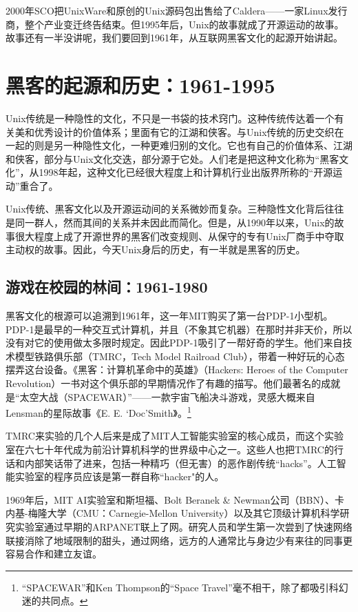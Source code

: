 \documentclass[12pt,oneside]{book}
\begin{document}
\begin{common-format}
2000年SCO把UnixWare和原创的Unix源码包出售给了Caldera——一家Linux发行商，整个产业变迁终告结束。但1995年后，Unix的故事就成了开源运动的故事。故事还有一半没讲呢，我们要回到1961年，从互联网黑客文化的起源开始讲起。

\section{黑客的起源和历史：1961-1995}
Unix传统是一种隐性的文化，不只是一书袋的技术窍门。这种传统传达着一个有关美和优秀设计的价值体系；里面有它的江湖和侠客。与Unix传统的历史交织在一起的则是另一种隐性文化，一种更难归别的文化。它也有自己的价值体系、江湖和侠客，部分与Unix文化交迭，部分源于它处。人们老是把这种文化称为“黑客文化”，从1998年起，这种文化已经很大程度上和计算机行业出版界所称的“开源运动”重合了。

Unix传统、黑客文化以及开源运动间的关系微妙而复杂。三种隐性文化背后往往是同一群人，然而其间的关系并未因此而简化。但是，从1990年以来，Unix的故事很大程度上成了开源世界的黑客们改变规则、从保守的专有Unix厂商手中夺取主动权的故事。因此，今天Unix身后的历史，有一半就是黑客的历史。


\subsection{游戏在校园的林间：1961-1980}
黑客文化的根源可以追溯到1961年，这一年MIT购买了第一台PDP-1小型机。PDP-1是最早的一种交互式计算机，并且（不象其它机器）在那时并非天价，所以没有对它的使用做太多限时规定。因此PDP-1吸引了一帮好奇的学生。他们来自技术模型铁路俱乐部（TMRC，Tech Model Railroad Club），带着一种好玩的心态摆弄这台设备。《黑客：计算机革命中的英雄》（Hackers:  Heroes of the Computer Revolution）\cite{Levy}一书对这个俱乐部的早期情况作了有趣的描写。他们最著名的成就是“太空大战（SPACEWAR）”——一款宇宙飞船决斗游戏，灵感大概来自Lensman的星际故事《E. E. ‘Doc’Smith》。\footnote{“SPACEWAR”和Ken Thompson的“Space Travel”毫不相干，除了都吸引科幻迷的共同点。}

TMRC来实验的几个人后来是成了MIT人工智能实验室的核心成员，而这个实验室在六七十年代成为前沿计算机科学的世界级中心之一。这些人也把TMRC的行话和内部笑话带了进来，包括一种精巧（但无害）的恶作剧传统“hacks”。人工智能实验室的程序员应该是第一群自称“hacker"的人。

1969年后，MIT AI实验室和斯坦福、Bolt Beranek \& Newman公司（BBN）、卡内基-梅隆大学（CMU：Carnegie-Mellon University）以及其它顶级计算机科学研究实验室通过早期的ARPANET联上了网。研究人员和学生第一次尝到了快速网络联接消除了地域限制的甜头，通过网络，远方的人通常比与身边少有来往的同事更容易合作和建立友谊。


\end{common-format}
\end{document}
